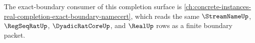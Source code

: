 The exact-boundary consumer of this completion surface is \autoref{ch:concrete-instances-real-completion-exact-boundary-namecert}, which reads the same $\StreamNameUp$, $\RegSeqRatUp$, $\DyadicRatCoreUp$, and $\RealUp$ rows as a finite boundary packet.






